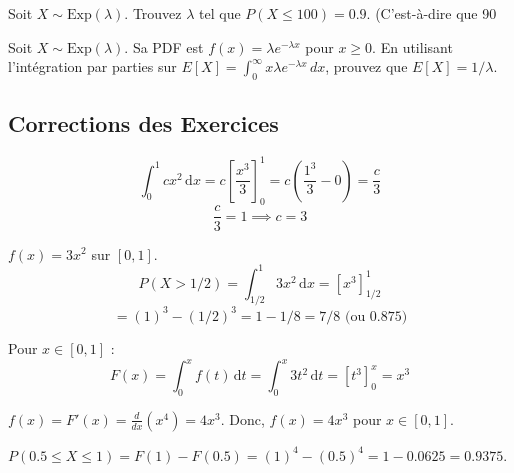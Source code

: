 \begin{exercicebox}
Soit $X \sim \text{Exp}(\lambda)$.
Trouvez $\lambda$ tel que $P(X \le 100) = 0.9$. (C'est-à-dire que 90%
\end{exercicebox}

\begin{exercicebox}
Soit $X \sim \text{Exp}(\lambda)$. Sa PDF est $f(x) = \lambda e^{-\lambda x}$ pour $x \ge 0$.
En utilisant l'intégration par parties sur $E[X] = \int_0^\infty x \lambda e^{-\lambda x} \, dx$, prouvez que $E[X] = 1/\lambda$.
\end{exercicebox}


\subsection{Corrections des Exercices}

\begin{correctionbox}
$$\int_0^1 cx^2 \, \mathrm{d}x = c \left[ \frac{x^3}{3} \right]_0^1 = c \left( \frac{1^3}{3} - 0 \right) = \frac{c}{3}$$
$$\frac{c}{3} = 1 \implies c = 3$$
\end{correctionbox}

\begin{correctionbox}
$f(x) = 3x^2$ sur $[0, 1]$.
$$P(X > 1/2) = \int_{1/2}^1 3x^2 \, \mathrm{d}x = \left[ x^3 \right]_{1/2}^1$$
$$= (1)^3 - (1/2)^3 = 1 - 1/8 = 7/8 \text{ (ou } 0.875 \text{)}$$
\end{correctionbox}

\begin{correctionbox}
Pour $x \in [0, 1]$ :
$$F(x) = \int_0^x f(t) \, \mathrm{d}t = \int_0^x 3t^2 \, \mathrm{d}t = \left[ t^3 \right]_0^x = x^3$$
\end{correctionbox}

\begin{correctionbox}
$f(x) = F'(x) = \frac{d}{dx} (x^4) = 4x^3$.
Donc, $f(x) = 4x^3$ pour $x \in [0, 1]$.
\end{correctionbox}

\begin{correctionbox}
$P(0.5 \le X \le 1) = F(1) - F(0.5) = (1)^4 - (0.5)^4 = 1 - 0.0625 = 0.9375$.
\end{correctionbox}

